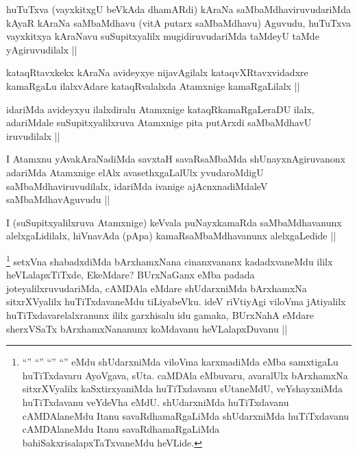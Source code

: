 
\begin{artha}
huTuTxva (vayxkitxgU beVkAda dhamARdi) kAraNa saMbaMdhaviruvudariMda kAyaR kAraNa saMbaMdhavu (vitA putarx saMbaMdhavu) Aguvudu, huTuTxva vayxkitxya kAraNavu suSupitxyalilx mugidiruvudariMda taMdeyU taMde yAgiruvudilalx ||
\end{artha}


\begin{artha}
kataqRtavxkekx kAraNa avideyxye nijavAgilalx kataqvXRtavxvidadxre kamaRgaLu ilalxvAdare kataqRvalalxda Atamxnige kamaRgaLilalx ||
\end{artha}

\begin{artha}
idariMda avideyxyu ilalxdiralu Atamxnige kataqRkamaRgaLeraDU ilalx, adariMdale suSupitxyalilxruva Atamxnige pita putArxdi saMbaMdhavU iruvudilalx ||
\end{artha}


\begin{artha}
I Atamxnu yAvakAraNadiMda savxtaH savaRsaMbaMda shUnayxnAgiruvanonx adariMda Atamxnige elAlx avasethxgaLalUlx yvudaroMdigU saMbaMdhaviruvudilalx, idariMda ivanige ajAcnxnadiMdaleV saMbaMdhavAguvudu ||
\end{artha}


\begin{artha}
I (suSupitxyalilxruva Atamxnige) keVvala puNayxkamaRda saMbaMdhavanunx alelxgaLidilalx, hiVnavAda (pApa) kamaRsaMbaMdhavanunx alelxgaLedide ||
\end{artha}


\begin{artha}
\footnote{``\stext'' ``\stext'' ``\stext'' ``\stext'' eMdu shUdarxniMda viloVma karxmadiMda eMba samxtigaLu huTiTxdavaru AyoVgava, sUta. caMDAla eMbuvaru, avaralUlx bArxhamxNa sitxrXVyalilx kaSxtirxyaniMda huTiTxdavanu sUtaneMdU, veYshayxniMda huTiTxdavanu veYdeVha eMdU. shUdarxniMda huTiTxdavanu cAMDAlaneMdu Itanu savaRdhamaRgaLiMda shUdarxniMda huTiTxdavanu cAMDAlaneMdu Itanu savaRdhamaRgaLiMda bahiSakxrisalapxTaTxvaneMdu heVLide.}
setxVna shabadxdiMda bArxhamxNana cinanxvananx kadadxvaneMdu ililx heVLalapxTiTxde, EkeMdare? BUrxNaGanx eMba padada joteyalilxruvudariMda, cAMDAla eMdare shUdarxniMda bArxhamxNa sitxrXVyalilx huTiTxdavaneMdu tiLiyabeVku. ideV riVtiyAgi viloVma jAtiyalilx huTiTxdavarelalxranunx ililx garxhisalu idu gamaka, BUrxNahA eMdare sherxVSaTx bArxhamxNananunx koMdavanu heVLalapxDuvanu ||
\end{artha}

